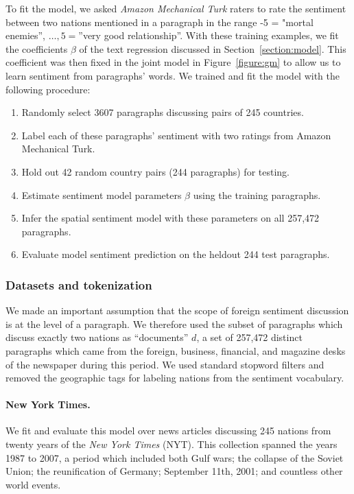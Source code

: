 To fit the model, we asked \emph{Amazon Mechanical Turk} raters to rate the
sentiment between two nations mentioned in a paragraph in the range -5
= "mortal enemies'', $\ldots, 5 = $''very good relationship''.
With these training examples, we fit the coefficients $\beta$ of the
text regression discussed in Section~\ref{section:model}.  This
coefficient was then fixed in the joint model in
Figure~\ref{figure:gm} to allow us to learn sentiment from
paragraphs' words.  We trained and fit the model with the following procedure:

\begin{enumerate}
  \item Randomly select 3607 paragraphs discussing pairs of 245 countries.
  \item Label each of these paragraphs' sentiment with two ratings
    from Amazon Mechanical Turk.
  \item Hold out 42 random country pairs (244 paragraphs) for testing.
  \item Estimate sentiment model parameters $\beta$ using the training
    paragraphs.
  \item Infer the spatial sentiment model with these parameters on
    all 257,472 paragraphs.
  \item Evaluate model sentiment prediction on the heldout 244 test
    paragraphs.
\end{enumerate}

\subsubsection{Datasets and tokenization}  We made an important
assumption that the scope of foreign sentiment discussion is at the
level of a paragraph.  We therefore used the subset of paragraphs
which discuss exactly two nations as ``documents'' $d$, a set of
257,472 distinct paragraphs which came from the foreign, business,
financial, and magazine desks of the newspaper during this period. We
used standard stopword filters and removed the geographic tags for
labeling nations from the sentiment vocabulary.

\label{section:experiments}

\paragraph{New York Times.} We fit and evaluate this model over news articles discussing 245
nations from twenty years of the \emph{New York Times} (NYT).  This
collection spanned the years 1987 to 2007, a period which included
both Gulf wars; the collapse of the Soviet Union; the reunification of
Germany; September 11th, 2001; and countless other world events.

